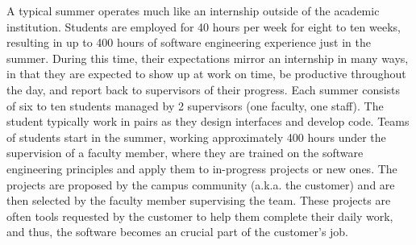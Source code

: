 A typical summer operates much like an internship outside of the academic institution. Students are employed for 40 hours per week for eight to ten weeks, resulting in up to 400 hours of software engineering experience just in the summer. During this time, their expectations mirror an internship in many ways, in that they are expected to show up at work on time, be productive throughout the day, and report back to supervisors of their progress. Each summer consists of six to ten students managed by 2 supervisors (one faculty, one staff). The student typically work in pairs as they design interfaces and develop code. 
Teams  of  students  start  in  the  summer,  working  approximately 400 hours under the supervision of a faculty member, where they are trained on the software engineering principles and apply  them  to  in-progress  projects  or  new  ones.  The  projects  are proposed by the campus community (a.k.a. the customer) and are then selected by the faculty member supervising the team. These projects are often tools requested by the customer to help them complete their daily work, and thus, the software becomes an crucial part of the customer’s job. 

